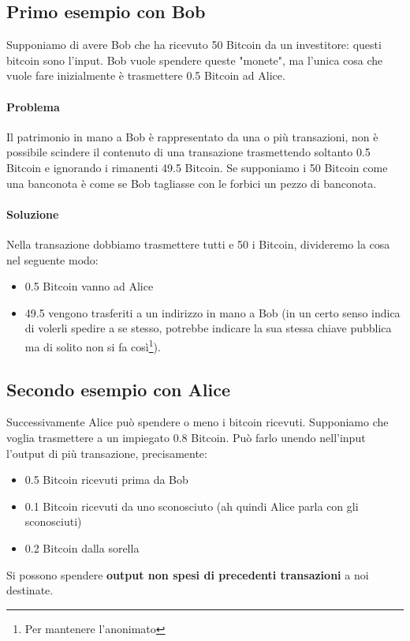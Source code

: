 \subsection{Primo esempio con Bob}
Supponiamo di avere Bob che ha ricevuto 50 Bitcoin da un investitore: questi bitcoin sono l'input. Bob vuole spendere queste "monete", ma l'unica cosa che vuole fare inizialmente è trasmettere 0.5 Bitcoin ad Alice. 
\paragraph{Problema} Il patrimonio in mano a Bob è rappresentato da una o più transazioni, non è possibile scindere il contenuto di una transazione trasmettendo soltanto 0.5 Bitcoin e ignorando i rimanenti 49.5 Bitcoin. Se supponiamo i 50 Bitcoin come una banconota è come se Bob tagliasse con le forbici un pezzo di banconota. 
\paragraph{Soluzione} Nella transazione dobbiamo trasmettere tutti e 50 i Bitcoin, divideremo la cosa nel seguente modo:
\begin{itemize}
	\item 0.5 Bitcoin vanno ad Alice
	\item 49.5 vengono trasferiti a un indirizzo in mano a Bob (in un certo senso indica di volerli spedire a se stesso, potrebbe indicare la sua stessa chiave pubblica ma di solito non si fa così\footnote{Per mantenere l'anonimato}).
\end{itemize}
\subsection{Secondo esempio con Alice}
Successivamente Alice può spendere o meno i bitcoin ricevuti. Supponiamo che voglia trasmettere a un impiegato 0.8 Bitcoin. Può farlo unendo nell'input l'output di più transazione, precisamente:
\begin{itemize}
	\item 0.5 Bitcoin ricevuti prima da Bob
	\item 0.1 Bitcoin ricevuti da uno sconosciuto (ah quindi Alice parla con gli sconosciuti)
	\item 0.2 Bitcoin dalla sorella
\end{itemize}
Si possono spendere \textbf{output non spesi di precedenti transazioni} a noi destinate.


